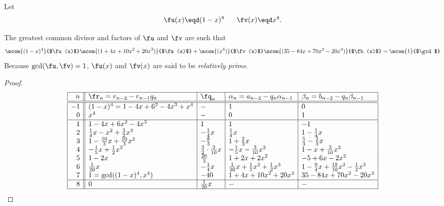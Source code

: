\begin{example}
\label{ex:eea_n=4}
Let 
  \[ \fu(x)\eqd (1-x)^4  \hspace{4ex} \fv(x)\eqd x^4. \]

The greatest common divisor and factors of $\fu$ and $\fv$ are such that
\[ \mcom{(1-x)^4}{$\fu(x)$} \mcom{(1 + 4x + 10x^2 + 20x^3)}{$\fa(x)$}   +
   \mcom{(x^4)  }{$\fv(x)$} \mcom{(35 -84x + 70x^2 -20x^3)}{$\fb(x)$} = 
   \mcom{1}{$\gcd$}
\]
Because $\gcd(\fu,\fv)=1$, $\fu(x)$ and $\fv(x)$ are said to be 
{\em relatively prime}.
\end{example}
\begin{proof}
\[\begin{array}{|r||l|l|l|l|}
  \hline
  n  & \fr_n=r_{n-2}-r_{n-1}q_n  & \fq_n   & \alpha_n=a_{n-2}-q_n \alpha_{n-1} & \beta_n=b_{n-2}-q_n \beta_{n-1}  \\
  \hline
  \hline
  -1  & (1-x)^4=1-4x+6^2-4x^3+x^4
      & - 
      & 1 
      & 0  
      \\
   0  & x^4
      & - 
      & 0 
      & 1  
      \\
  \hline
   1  & 1-4x+6x^2-4x^3
      &  1  
      &  1
      & -1
      \\
   2  & \frac{1}{4}x - x^2 +\frac{3}{2}x^3
      & -\frac{1}{4}x
      & \frac{1}{4}x
      & 1-\frac{1}{4}x
      \\
   3  & 1 - \frac{10}{3}x + \frac{10}{3}x^2 
      & -         \frac{8}{3}
      & 1 + \frac{2}{3}x 
      & \frac{5}{3} - \frac{2}{3}x
      \\
   4  & -\frac{1}{5}x + \frac{1}{2}x^2
      & \frac{3}{2}\cdot\frac{3}{10}x
      & -\frac{1}{5}x - \frac{3}{10}x^2 
      & 1 - x + \frac{3}{10}x^2
      \\
   5  & 1 - 2x  
      & \frac{20}{3}
      & 1 + 2x + 2x^2
      &  -5 + 6x - 2x^2
      \\
   6  & \frac{1}{20}x
      & -\frac{1}{4}x
      & \frac{1}{20}x + \frac{1}{5}x^2  + \frac{1}{2}x^3
      & 1 -\frac{9}{4}x + \frac{18}{10}x^2 - \frac{1}{2}x^3
      \\
   7  & 1 = \gcd((1-x)^4,x^4)
      & -40
      & 1 + 4x + 10x^2 + 20x^3 
      & 35 -84x + 70x^2 -20x^3 
      \\
  \hline
   8  & 0
      & \frac{1}{20}x
      & -
      & -
      \\
  \hline
\end{array}\]
\end{proof}

